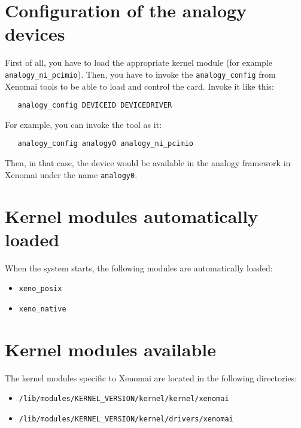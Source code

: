 \documentclass[11pt]{book}
\begin{document}
   \section{Configuration of the analogy devices}
   First of all, you have to load the appropriate kernel module (for example
   \texttt{analogy\_ni\_pcimio}). Then, you have to invoke the
   \texttt{analogy\_config} from Xenomai tools to be able to load and control
   the card. Invoke it like this:
   \begin{verbatim}
   analogy_config DEVICEID DEVICEDRIVER
   \end{verbatim}


   For example, you can invoke the tool as it:
   \begin{verbatim}
   analogy_config analogy0 analogy_ni_pcimio
   \end{verbatim}

   Then, in that case, the device would be available in the analogy framework in
   Xenomai under the name \texttt{analogy0}.

   \section{Kernel modules automatically loaded}
   When the system starts, the following modules are automatically loaded:
   \begin{itemize}
      \item
         \texttt{xeno\_posix}
      \item
         \texttt{xeno\_native}
   \end{itemize}

   \section{Kernel modules available}
   The kernel modules specific to Xenomai are located in the following
   directories:
   \begin{itemize}
      \item
         \texttt{/lib/modules/KERNEL\_VERSION/kernel/kernel/xenomai}
      \item
         \texttt{/lib/modules/KERNEL\_VERSION/kernel/drivers/xenomai}
   \end{itemize}
\end{document}
